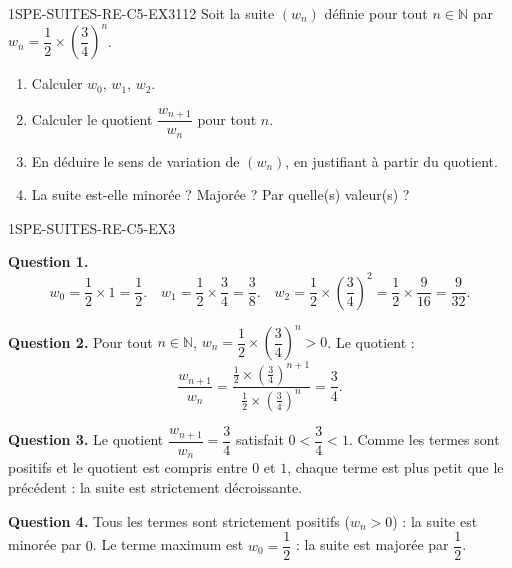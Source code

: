 
\begin{exercice}{1SPE-SUITES-RE-C5-EX3}{1}{12}
Soit la suite $(w_n)$ définie pour tout $n \in \mathbb{N}$ par $w_n = \dfrac{1}{2} \times \left(\dfrac{3}{4}\right)^n$.
\begin{enumerate}
  \item Calculer $w_0$, $w_1$, $w_2$.
  \item Calculer le quotient $\dfrac{w_{n+1}}{w_n}$ pour tout $n$.
  \item En déduire le sens de variation de $(w_n)$, en justifiant à partir du quotient.
  \item La suite est-elle minorée ? Majorée ? Par quelle(s) valeur(s) ?
\end{enumerate}
\end{exercice}


\begin{corrige}{1SPE-SUITES-RE-C5-EX3}

\textbf{Question 1.}
\[
w_0 = \frac{1}{2} \times 1 = \frac{1}{2}. \quad
w_1 = \frac{1}{2} \times \frac{3}{4} = \frac{3}{8}. \quad
w_2 = \frac{1}{2} \times \left(\frac{3}{4}\right)^2 = \frac{1}{2} \times \frac{9}{16} = \frac{9}{32}.
\]

\textbf{Question 2.} Pour tout $n \in \mathbb{N}$, $w_n = \dfrac{1}{2} \times \left(\dfrac{3}{4}\right)^n > 0$. Le quotient :
\[
\frac{w_{n+1}}{w_n} = \frac{\frac{1}{2} \times \left(\frac{3}{4}\right)^{n+1}}{\frac{1}{2} \times \left(\frac{3}{4}\right)^n} = \frac{3}{4}.
\]

\textbf{Question 3.} Le quotient $\dfrac{w_{n+1}}{w_n} = \dfrac{3}{4}$ satisfait $0 < \dfrac{3}{4} < 1$. Comme les termes sont positifs et le quotient est compris entre $0$ et $1$, chaque terme est plus petit que le précédent : la suite est strictement décroissante.

\textbf{Question 4.} Tous les termes sont strictement positifs ($w_n > 0$) : la suite est minorée par $0$. Le terme maximum est $w_0 = \dfrac{1}{2}$ : la suite est majorée par $\dfrac{1}{2}$.

\end{corrige}
